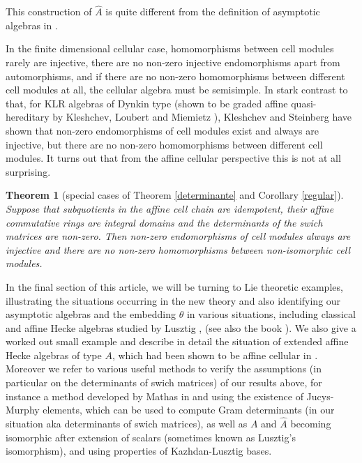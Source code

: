 \documentclass[oneside, a4paper, 11pt]{amsart}
\newtheorem{Theox}{Theorem}
\begin{document}
This construction of $\hat{A}$ is quite different from the definition of
asymptotic algebras in \cite{KXaffine}.
\medskip

In the finite dimensional cellular case, homomorphisms between cell modules
rarely are injective, there are no non-zero injective endomorphisms apart
from automorphisms, and if there are no non-zero homomorphisms between
different cell modules at all, the cellular algebra must be semisimple. In
stark contrast to that, for KLR algebras of Dynkin type (shown to be graded
affine quasi-hereditary by Kleshchev, Loubert and Miemietz \cite{KLM}),
Kleshchev and Steinberg \cite{KS} have shown that non-zero endomorphisms
of cell modules exist and always are injective, but
there are no non-zero homomorphisms between different cell modules.
It turns out that from the affine cellular perspective this is not at all
surprising. 

\begin{Theox}[special cases of Theorem \ref{determinante} and Corollary
  \ref{regular}]
\label{TheoremE}
Suppose that subquotients in the affine cell chain are idempotent, their affine commutative rings are integral
domains and the determinants of the swich matrices are non-zero. Then
non-zero endomorphisms of cell modules always are injective and there are
no non-zero homomorphisms between non-isomorphic cell modules.
\end{Theox}

In the final section of this article, we will be
turning to Lie theoretic examples, illustrating the situations occurring in the
new theory and also identifying our asymptotic algebras and the embedding
$\theta$ in various situations, including classical and affine Hecke
algebras studied by Lusztig \cite{Lusztig2}, (see also the book
\cite{GeckJacon}). We also give a worked out small example and
describe in detail the situation
of extended affine Hecke algebras of type $A$, which had been shown
to be affine cellular in \cite{KXaffine}.
Moreover we refer to  various useful methods to verify the assumptions (in
particular on the determinants of swich matrices) of our results above, for
instance a method developed by Mathas in \cite{Mathas} and using the existence
of Jucys-Murphy elements, which can be used to compute Gram determinants
(in our situation aka determinants of swich matrices), as well as $A$ and
$\hat{A}$ becoming isomorphic after extension of scalars (sometimes known as
Lusztig's isomorphism), and using properties of Kazhdan-Lusztig bases.
\end{document}
